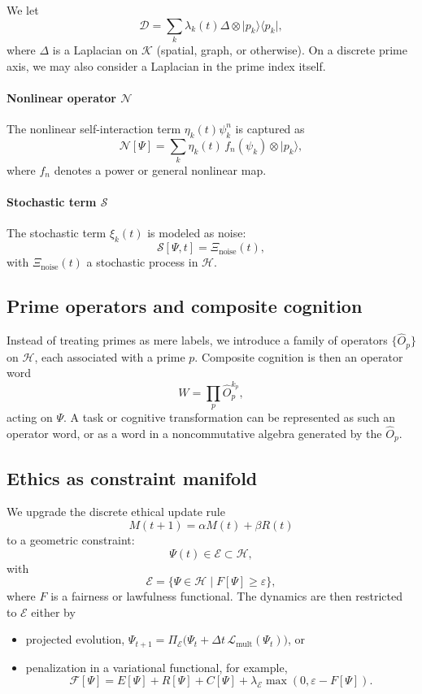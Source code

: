 \documentclass[11pt]{article}
\begin{document}
We let
\[
\mathcal{D} = \sum_k \lambda_k(t) \Delta \otimes \lvert p_k\rangle\langle p_k\rvert,
\]
where $\Delta$ is a Laplacian on $\mathcal{K}$ (spatial, graph, or otherwise). On a discrete prime axis, we may also consider a Laplacian in the prime index itself.

\paragraph{Nonlinear operator $\mathcal{N}$}

The nonlinear self-interaction term $\eta_k(t)\psi_k^n$ is captured as
\[
\mathcal{N}[\Psi] = \sum_k \eta_k(t)\, f_n(\psi_k)\otimes \lvert p_k\rangle,
\]
where $f_n$ denotes a power or general nonlinear map.

\paragraph{Stochastic term $\mathcal{S}$}

The stochastic term $\xi_k(t)$ is modeled as noise:
\[
\mathcal{S}[\Psi,t] = \Xi_{\mathrm{noise}}(t),
\]
with $\Xi_{\mathrm{noise}}(t)$ a stochastic process in $\mathcal{H}$.

\subsection{Prime operators and composite cognition}

Instead of treating primes as mere labels, we introduce a family of operators $\{\hat{O}_p\}$ on $\mathcal{H}$, each associated with a prime $p$. Composite cognition is then an operator word
\[
W = \prod_p \hat{O}_p^{k_p},
\]
acting on $\Psi$. A task or cognitive transformation can be represented as such an operator word, or as a word in a noncommutative algebra generated by the $\hat{O}_p$.

\subsection{Ethics as constraint manifold}

We upgrade the discrete ethical update rule
\[
M(t+1) = \alpha M(t) + \beta R(t)
\]
to a geometric constraint:
\begin{equation}
\Psi(t)\in\mathcal{E}\subset\mathcal{H},
\end{equation}
with
\[
\mathcal{E} = \{\Psi\in\mathcal{H} \mid F[\Psi] \geq \varepsilon\},
\]
where $F$ is a fairness or lawfulness functional. The dynamics are then restricted to $\mathcal{E}$ either by
\begin{itemize}[nosep]
\item projected evolution, $\Psi_{t+1} = \Pi_{\mathcal{E}}\big(\Psi_t + \Delta t\,\mathcal{L}_{\mathrm{mult}}(\Psi_t)\big)$, or
\item penalization in a variational functional, for example,
\[
\mathcal{F}[\Psi] = E[\Psi] + R[\Psi] + C[\Psi] + \lambda_{\mathcal{E}}\max(0,\varepsilon - F[\Psi]).
\]
\end{itemize}
\end{document}
